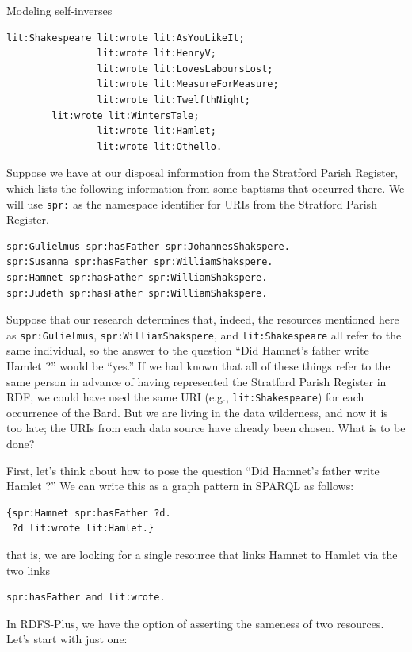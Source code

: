 \begin{challenge}{Modeling self-inverses}
\begin{lstlisting}
lit:Shakespeare lit:wrote lit:AsYouLikeIt;
                lit:wrote lit:HenryV;
                lit:wrote lit:LovesLaboursLost;
                lit:wrote lit:MeasureForMeasure; 
                lit:wrote lit:TwelfthNight;
		lit:wrote lit:WintersTale; 
                lit:wrote lit:Hamlet;
                lit:wrote lit:Othello.
\end{lstlisting}

Suppose we have at our disposal information from the Stratford Parish
Register, which lists the following information from some baptisms that
occurred there. We will use \texttt{spr:} as the namespace identifier for URIs
from the Stratford Parish Register.

\begin{lstlisting}
spr:Gulielmus spr:hasFather spr:JohannesShakspere.
spr:Susanna spr:hasFather spr:WilliamShakspere.
spr:Hamnet spr:hasFather spr:WilliamShakspere.
spr:Judeth spr:hasFather spr:WilliamShakspere.
\end{lstlisting}

Suppose that our research determines that, indeed, the resources
mentioned here as \texttt{spr:Gulielmus}, \texttt{spr:WilliamShakspere}, and
\texttt{lit:Shakespeare} all refer to the same individual, so the answer to the
question ``Did Hamnet's father write Hamlet ?'' would be ``yes.'' If we
had known that all of these things refer to the same person in advance
of having represented the Stratford Parish Register in RDF, we could
have used the same URI (e.g., \texttt{lit:Shakespeare}) for
each occurrence of the Bard. But we are living in the data wilderness,
and now it is too late; the URIs from each data source have already been
chosen. What is to be done?

First, let's think about how to pose the question ``Did Hamnet's father
write Hamlet ?'' We can write this as a graph pattern in SPARQL as
follows:

\begin{lstlisting}
{spr:Hamnet spr:hasFather ?d.
 ?d lit:wrote lit:Hamlet.}
\end{lstlisting}

that is, we are looking for a single resource that links Hamnet to
Hamlet via the two links

\begin{lstlisting}
spr:hasFather and lit:wrote.
\end{lstlisting}

In RDFS-Plus, we have the option of asserting the sameness of two
resources. Let's start with just one:


\end{challenge}
